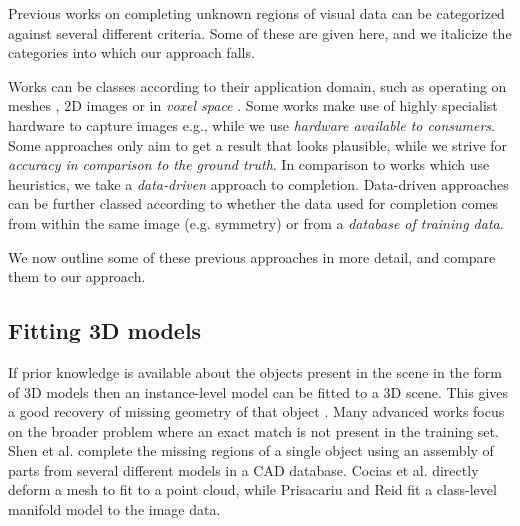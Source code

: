 \documentclass[10pt,twocolumn,letterpaper]{article}
\makeatletter
\renewcommand*{\eg}{e.g.\@\xspace}
\newcommand*{\ea}{et al.\@\xspace}
\makeatother
\begin{document}


Previous works on completing unknown regions of visual data can be categorized against several different criteria.
Some of these are given here, and we italicize the categories into which our approach falls.

Works can be classes according to their application domain, such as operating on meshes \cite{schnabel-eurographics-2009, ju-cst-2009}, 2D images \cite{gupta-cvpr-2011} or in \emph{voxel space} \cite{kim-iccv-2013}.
Some works make use of highly specialist hardware to capture images \eg \cite{velten-nature-2012}, while we use \emph{hardware available to consumers}.
Some approaches only aim to get a result that looks plausible, while we strive for \emph{accuracy in comparison to the ground truth}.
In comparison to works which use heuristics, we take a \emph{data-driven} approach to completion.
Data-driven approaches can be further classed according to whether the data used for completion comes from within the same image (\eg symmetry\cite{kroemer-humanoids-2012}) or from a \emph{database of training data}.

We now outline some of these previous approaches in more detail, and compare them to our approach.

\subsection{Fitting 3D models}
If prior knowledge is available about the objects present in the scene in the form of 3D models then an instance-level model can be fitted to a 3D scene.
This gives a good recovery of missing geometry of that object \cite{hinterstoisser-accv-2012, drost-3dimpvt-2012, rusu-iros-2010}.
Many advanced works focus on the broader problem where an exact match is not present in the training set.
Shen \ea \cite{shen-tog-2012} complete the missing regions of a single object using an assembly of parts from several different models in a CAD database.
Cocias \ea \cite{cocias-cgvcv-2013} directly deform a mesh to fit to a point cloud, while Prisacariu and Reid \cite{prisacariu-iccv-2011} fit a class-level manifold model to the image data.
\end{document}
